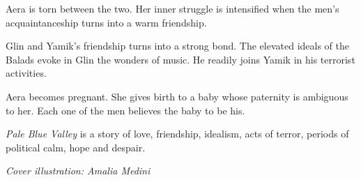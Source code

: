 \documentclass[
  spinewidth=0.8325in,
  coverwidth=6in,
  coverheight=9.5in,
  marklength=0.0in,
  bleedwidth=0.125in,
  12pt
]{bookcover}
\begin{document}
\begin{bookcover}
{{\begin{addmargin}[0.5in]{0.2in}
Aera is torn between the two. Her inner struggle is intensified when
the men's acquaintanceship turns into a warm friendship.

Glin and Yamik's friendship turns into a strong bond. The elevated
ideals of the Balads evoke in Glin the wonders of music. He readily
joins Yamik in his terrorist activities.

Aera becomes pregnant. She gives birth to a baby whose \hbox{paternity} is
ambiguous to her. Each one of the men believes the baby to be his.

\emph{Pale Blue Valley} is a story of love, friendship, idealism, acts of
terror, periods of political calm, hope and despair.

\vspace{0.2in}
\textit{Cover illustration: Amalia Medini}

\end{addmargin}
    }

}


\end{bookcover}
\end{document}
